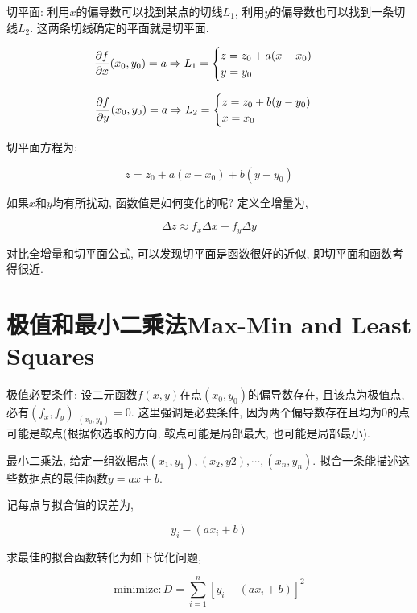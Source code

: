 切平面: 利用$ x $的偏导数可以找到某点的切线$ L_1 $, 利用$ y $的偏导数也可以找到一条切线$ L_2 $. 这两条切线确定的平面就是切平面.

\begin{equation}
\frac{\partial f}{\partial x}(x_0,y_0)=a \Rightarrow L_1=
\begin{cases}
z=z_0+a(x-x_0) \\
y=y_0
\end{cases}
\end{equation}

\begin{equation}
\frac{\partial f}{\partial y}(x_0,y_0)=a \Rightarrow L_2=
\begin{cases}
z=z_0+b(y-y_0) \\
x=x_0
\end{cases}
\end{equation}

切平面方程为:

\begin{equation}
z=z_0+a(x-x_0)+b(y-y_0)
\end{equation}

如果$ x $和$ y $均有所扰动, 函数值是如何变化的呢? 定义全增量为,

\begin{equation}
\Delta z\approx f_x \Delta x+f_y \Delta y
\end{equation}

对比全增量和切平面公式, 可以发现切平面是函数很好的近似, 即切平面和函数考得很近.

\section{极值和最小二乘法Max-Min and Least Squares}

极值必要条件: 设二元函数$ f(x,y) $在点$ (x_0,y_0) $的偏导数存在, 且该点为极值点, 必有$ (f_x, f_y)|_{(x_0, y_0)} = 0 $. 这里强调是必要条件, 因为两个偏导数存在且均为$ 0 $的点可能是鞍点(根据你选取的方向, 鞍点可能是局部最大, 也可能是局部最小).

最小二乘法, 给定一组数据点$ (x_1,y_1), (x_2,y2), \cdots, (x_n,y_n) $. 拟合一条能描述这些数据点的最佳函数$ y=ax+b $.

记每点与拟合值的误差为,

\begin{equation}
y_i-(ax_i+b)
\end{equation}

求最佳的拟合函数转化为如下优化问题,

\begin{equation}
\text{minimize}: D=\sum_{i=1}^n\left[y_i-(ax_i+b)\right]^2
\end{equation}

